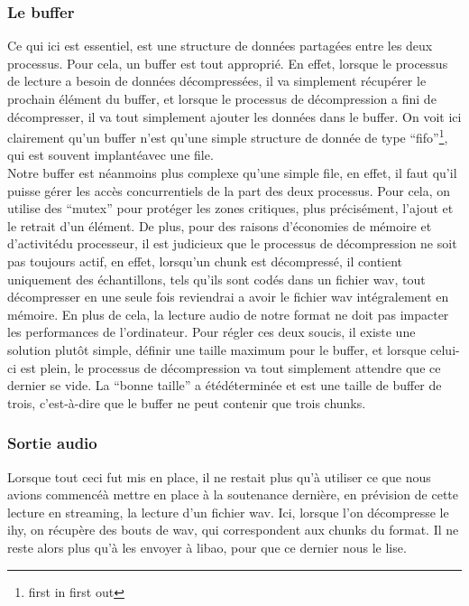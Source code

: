 \documentclass[a4paper,12pt]{article}
\begin{document}
		\subsubsection{Le buffer}
Ce qui ici est essentiel, est une structure de donn\'ees partag\'ees entre les
deux processus. Pour cela, un buffer est
tout appropri\'e. En effet, lorsque le processus de lecture a besoin de donn\'ees
d\'ecompress\'ees, il va simplement r\'ecup\'erer le prochain \'el\'ement du buffer, et
lorsque le processus de d\'ecompression a fini de d\'ecompresser, il va tout
simplement ajouter les donn\'ees dans le buffer. On voit ici clairement qu'un
buffer n'est qu'une simple structure de donn\'ee de type ``fifo''\footnote{first
in first out}, qui est souvent implant\'eavec une file.\\
Notre buffer est n\'eanmoins plus complexe qu'une simple file, en effet, il faut
qu'il puisse g\'erer les acc\`es concurrentiels de la part des deux processus. Pour
cela, on utilise des ``mutex'' pour prot\'eger les zones critiques, plus
pr\'ecis\'ement, l'ajout et le retrait d'un \'el\'ement. De plus, pour des raisons
d'\'economies de m\'emoire et d'activit\'edu processeur, il est judicieux que le
processus de d\'ecompression ne
soit pas toujours actif, en effet, lorsqu'un chunk est d\'ecompress\'e, il contient
uniquement des \'echantillons, tels qu'ils sont cod\'es dans un fichier wav, tout
d\'ecompresser en une seule fois reviendrai a avoir le fichier wav int\'egralement
en m\'emoire. En plus de cela, la lecture audio de notre format ne doit pas
impacter les performances de l'ordinateur. Pour r\'egler ces deux soucis, il
existe une solution plutôt simple, d\'efinir une taille maximum pour le buffer, et
lorsque celui-ci est plein, le processus de d\'ecompression va tout simplement
attendre que ce dernier se vide. La ``bonne taille'' a \'et\'ed\'etermin\'ee et est une
taille de buffer de trois, c'est-à-dire que le buffer ne peut contenir que
trois chunks.\\
		\subsubsection{Sortie audio}
Lorsque tout ceci fut mis en place, il ne restait plus qu'à utiliser ce que nous
avions commenc\'eà mettre en place à la soutenance derni\`ere, en pr\'evision de
cette lecture en streaming, la lecture d'un fichier wav. Ici, lorsque l'on
d\'ecompresse le ihy, on r\'ecup\`ere des bouts de wav, qui correspondent aux chunks
du format. Il ne reste alors plus qu'à les envoyer à libao, pour que ce dernier
nous le lise.
\end{document}
